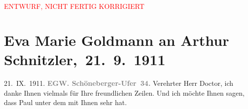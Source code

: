 
\begin{center}
            \textcolor{red}{ENTWURF, NICHT FERTIG KORRIGIERT}
                      \end{center}
            
         
         \renewcommand{\erwaehntePersonen}{Personen:  ?? [Tochter von Gertrud Wertheim], Paul Goldmann, Dolly Henriette Julia Landsberger, Gertrud Wertheim, Gisbert von Wolff-Metternich}
         \renewcommand{\erwaehnteInstitutionen}{Institutionen: Vossische Zeitung}
         \renewcommand{\erwaehnteOrte}{Orte: Berlin, Bozen, Schöneberger Ufer, Wien}
         \renewcommand{\erwaehnteWerke}{Werke: Der Prozeß gegen den Grafen Wolff-Metternich. Eine Erklärung der Frau Wertheim, Neues Wiener Journal, [Brief von Getrud Wertheim]}
               \section[ Eva Marie Goldmann an Arthur Schnitzler, 21. 9. 1911]{ Eva Marie Goldmann an Arthur Schnitzler, 21. 9. 1911}\nopagebreak{}\rehead{ }\begin{ledgroupsized}[t]{13cm}\normalsize\beginnumbering \toendnotes[C]{\smallbreak\pagebreak[2]} 
\toendnotes[C]{\smallbreak}\pstart
           \raggedleft{}{\pb}21. IX. 1911.\pend
           \pstart
           \textcolor{gray}{\textbf{EG}}\hfill \textcolor{gray}{\textbf{W. Schöneberger-Ufer 34.}}\pend
           \pstart
           Verehrter Herr Doctor, ich danke Ihnen vielmals für Ihre
               freundlichen Zeilen.\pend
           \pstart
           Und ich möchte Ihnen sagen, dass Paul unter
               dem \label{K_L03540-1v}\label{K_L03540-1h} mit Ihnen sehr \label{K_L03540-3v}\label{K_L03540-3h} hat.\pend

\end{ledgroupsized}
